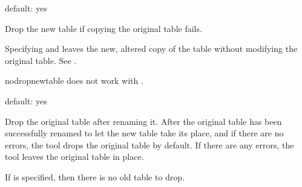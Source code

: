 \documentclass[letterpaper,10pt,english]{sphinxmanual}
\begin{document}
\begin{fulllineitems}
\label{\detokenize{mariadb-schema-change:cmdoption-mariadb-schema-change-5}}
default: yes

Drop the new table if copying the original table fails.

Specifying  and  leaves the new,
altered copy of the table without modifying the original table.  See
{\hyperref[\detokenize{mariadb-schema-change:cmdoption-mariadb-schema-change-new-table-name}]{}}.

\textendash{}no\sphinxhyphen{}drop\sphinxhyphen{}new\sphinxhyphen{}table does not work with
.

\end{fulllineitems}


\begin{fulllineitems}
\label{\detokenize{mariadb-schema-change:cmdoption-mariadb-schema-change-6}}
default: yes

Drop the original table after renaming it. After the original table has been
successfully renamed to let the new table take its place, and if there are no
errors, the tool drops the original table by default. If there are any errors,
the tool leaves the original table in place.

If  is specified, then there is no old table to drop.

\end{fulllineitems}
\end{document}

